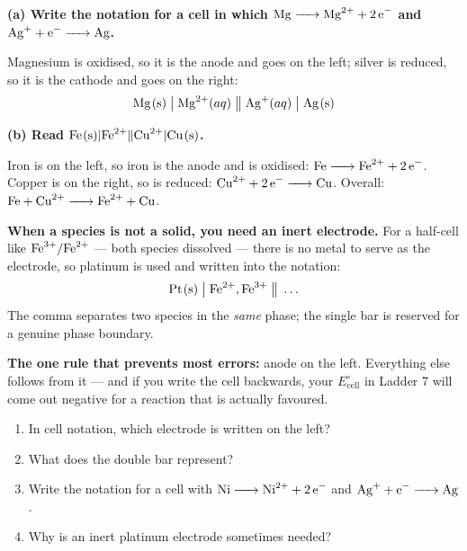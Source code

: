 \documentclass{apchem-worksheet}
\begin{document}
\begin{workedexample}
\textbf{(a) Write the notation for a cell in which
$\ce{Mg -> Mg^2+ + 2e-}$ and $\ce{Ag+ + e- -> Ag}$.}

Magnesium is oxidised, so it is the anode and goes on the left; silver
is reduced, so it is the cathode and goes on the right:
\[ \ce{Mg(s)} \;\big|\; \ce{Mg^2+}(aq) \;\big\|\;
   \ce{Ag+}(aq) \;\big|\; \ce{Ag(s)} \]

\textbf{(b) Read $\ce{Fe(s)}|\ce{Fe^2+}\|\ce{Cu^2+}|\ce{Cu(s)}$.}

Iron is on the left, so iron is the anode and is oxidised:
$\ce{Fe -> Fe^2+ + 2e-}$. Copper is on the right, so  is
reduced: $\ce{Cu^2+ + 2e- -> Cu}$. Overall:
$\ce{Fe + Cu^2+ -> Fe^2+ + Cu}$.

\textbf{When a species is not a solid, you need an inert electrode.}
For a half-cell like $\ce{Fe^3+}/\ce{Fe^2+}$ --- both species dissolved
--- there is no metal to serve as the electrode, so platinum is used and
written into the notation:
\[ \ce{Pt(s)} \;\big|\; \ce{Fe^2+}, \ce{Fe^3+} \;\big\|\; \ldots \]
The comma separates two species in the \emph{same} phase; the single
bar is reserved for a genuine phase boundary.

\textbf{The one rule that prevents most errors:} anode on the left.
Everything else follows from it --- and if you write the cell backwards,
your $E^{\circ}_{\text{cell}}$ in Ladder 7 will come out negative for a
reaction that is actually favoured.
\end{workedexample}

\begin{yourturn}
\begin{enumerate}[leftmargin=*,itemsep=0.5em]
  \item In cell notation, which electrode is written on the left?
        \workspace[1.4cm]
  \item What does the double bar represent? \workspace[1.4cm]
  \item Write the notation for a cell with $\ce{Ni -> Ni^2+ + 2e-}$ and
        $\ce{Ag+ + e- -> Ag}$. \workspace[1.8cm]
  \item Why is an inert platinum electrode sometimes needed?
        \workspace[1.8cm]
\end{enumerate}
\end{yourturn}
\end{document}

